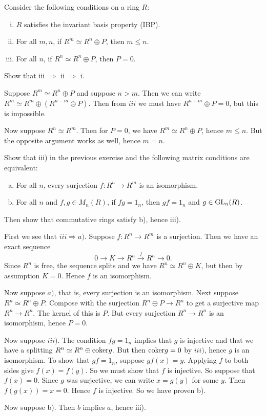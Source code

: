 \documentclass[11pt, english]{article}
\begin{document}
\begin{exc}
Consider the following conditions on a ring $R$:
\begin{enumerate}[i)]
\item $R$ satisfies the invariant basis property (IBP).
\item For all $m,n$, if $R^m \simeq R^n \oplus P$, then $m \leq n$.
\item For all $n$, if $R^n \simeq R^n \oplus P$, then $P=0$.
\end{enumerate}
Show that iii $\Rightarrow$ ii $\Rightarrow$ i. 
\end{exc}
\begin{sol}
Suppose $R^m \simeq R^n \oplus P$ and suppose $n > m$. Then we can write $R^m \simeq R^m \oplus (R^{n-m} \oplus P)$. Then from $iii$ we must have $R^{n-m} \oplus P = 0$, but this is impossible.

Now suppose $R^n \simeq R^m$. Then for $P=0$, we have $R^m \simeq R^n \oplus P$, hence $m \leq n$. But the opposite argument works as well, hence $m=n$.
\end{sol}

\begin{exc}
 Show that iii) in the previous exercise and the following matrix conditions are equivalent:
 \begin{enumerate}[a)]
 \item For all $n$, every surjection $f:R^n \to R^m$ is an isomorphism. 
\item  For all $n$ and $f,g \in M_n(R)$, if $fg=1_n$, then $gf=1_n$ and $g \in \operatorname{GL}_n(R)$.
 \end{enumerate}
Then show that commutative rings satisfy b), hence iii).
\end{exc}
\begin{sol}
 First we see that $iii  \Rightarrow a)$. Suppose $f:R^n \to R^m$ is a surjection. Then we have an exact sequence
\[
0 \to K \to R^n \xrightarrow{f} R^n \to 0.
\]
Since $R^n$ is free, the sequence splits and we have $R^n \simeq R^n \oplus K$, but then by assumption $K=0$. Hence $f$ is an isomorphism.

Now suppose $a)$, that is,  every surjection is an isomorphism. Next suppose $R^n \simeq R^n \oplus P$. Compose with the surjection $R^n \oplus P \to R^n$ to get a surjective map $R^n \to R^n$. The kernel of this is $P$. But every surjection $R^n\to R^n$ is an isomorphism, hence $P=0$.

Now suppose $iii)$. The condition $fg=1_n$ implies that $g$ is injective and that we have a splitting $R^n \simeq R^n \oplus \text{coker} g$. But then $\text{coker} g=0$ by $iii)$, hence $g$ is an isomorphism. To show that $gf=1_n$, suppose $gf(x)=y$. Applying $f$ to both sides give $f(x)=f(y)$. So we must show that $f$ is injective. So suppose that $f(x)=0$. Since $g$ was surjective, we can write $x=g(y)$ for some $y$. Then $f(g(x))=x=0$. Hence $f$ is injective. So we have proven b). 

Now suppose b). Then $b$ implies $a$, hence iii).
\end{sol}
\end{document}
